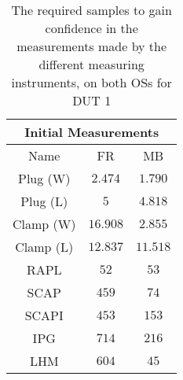 \begin{table}[H]
    \centering
    \begin{tabular}{|| c | c | c ||}
    \hline
    \multicolumn{3}{||c||}{Initial Measurements} \\ [0.5ex] \hline\hline
    Name & FR & MB \\\hline
    Plug (W) & $2.474$ & $1.790$ \\
    Plug (L) & $5$ & $4.818$ \\
    Clamp (W) & $16.908$ & $2.855$ \\
    Clamp (L) & $12.837$ & $11.518$ \\
    RAPL & $52$ & $53$ \\
    SCAP & $459$ & $74$ \\
    SCAPI & $453$ & $153$ \\
    IPG & $714$ & $216$ \\
    LHM & $604$ & $45$ \\\hline
    \end{tabular}
    \caption{The required samples to gain confidence in the measurements made by the different measuring instruments, on both OSs for DUT 1}
    \label{tab:initial-measurements-exp-2-dut-1}
\end{table}